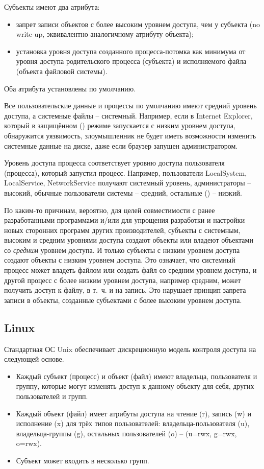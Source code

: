 Субъекты имеют два атрибута:
\begin{itemize}
    \item запрет записи объектов с более высоким уровнем доступа, чем у субъекта (no write-up, эквивалентно аналогичному атрибуту объекта);
    \item установка уровня доступа созданного процесса-потомка как минимума от уровня доступа родительского процесса (субъекта) и исполняемого файла (объекта файловой системы).
\end{itemize}
Оба атрибута установлены по умолчанию.

Все пользовательские данные и процессы по умолчанию имеют средний уровень доступа, а системные файлы -- системный. Например, если в Internet Explorer, который в защищённом () режиме запускается с низким уровнем доступа, обнаружится уязвимость, злоумышленник не будет иметь возможности изменить системные данные на диске, даже если браузер запущен администратором.

Уровень доступа процесса соответствует уровню доступа пользователя (процесса), который запустил процесс. Например, пользователи LocalSystem, LocalService, NetworkService получают системный уровень, администраторы -- высокий, обычные пользователи системы -- средний, остальные () -- низкий.

По каким-то причинам, вероятно, для целей совместимости с ранее разработанными программами и/или для упрощения разработки и настройки новых сторонних программ других производителей, субъекты с системным, высоким и средним уровнями доступа создают объекты или владеют объектами со \emph{средним} уровнем доступа. И только субъекты с низким уровнем доступа создают объекты с низким уровнем доступа. Это означает, что системный процесс может владеть файлом или создать файл со средним уровнем доступа, и другой процесс с более низким уровнем доступа, например средним, может получить доступ к файлу, в т.~ч. и на запись. Это нарушает принцип запрета записи в объекты, созданные субъектами с более высоким уровнем доступа.


\subsection{Linux}

Стандартная ОС Unix обеспечивает дискреционную модель контроля доступа на следующей основе.
\begin{itemize}
    \item Каждый субъект (процесс) и объект (файл) имеют владельца, пользователя и группу, которые могут изменять доступ к данному объекту для себя, других пользователей и групп.
    \item Каждый объект (файл) имеет атрибуты доступа на чтение (r), запись (w) и исполнение (x) для трёх типов пользователей: владельца-пользователя (u), владельца-группы (g), остальных пользователей (o) -- (u=rwx, g=rwx, o=rwx).
    \item Субъект может входить в несколько групп.
\end{itemize}

